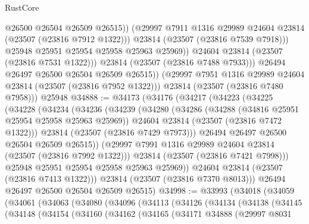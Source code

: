 \begin{lexlean}{RustCore}
\begin{coremodule}
                        @26500
                        @26504
                        @26509
                        @26515))
                    (@29997 @7911 @1316 @29989 @24604 @23814 (@23507 (@23816 @7912 @1322)))
                    @23814
                    (@23507 (@23816 @7539 @7918)))
                  @25948
                  @25951
                  @25954
                  @25958
                  @25963
                  @25969))
              @24604
              @23814
              (@23507 (@23816 @7531 @1322)))
            @23814
            (@23507 (@23816 @7488 @7933)))
          @26494
          @26497
          @26500
          @26504
          @26509
          @26515))
      (@29997 @7951 @1316 @29989 @24604 @23814 (@23507 (@23816 @7952 @1322)))
      @23814
      (@23507 (@23816 @7480 @7958)))
    @25948
@34888 := @34173
    (@34176
      (@34217
        (@34223
          (@34225
            (@34228
              (@34234
                (@34236
                  (@34239
                    (@34280
                      (@34286
                        (@34288 (@34816 @25951 @25954 @25958 @25963 @25969))
                        @24604
                        @23814
                        (@23507 (@23816 @7472 @1322)))
                      @23814
                      (@23507 (@23816 @7429 @7973)))
                    @26494
                    @26497
                    @26500
                    @26504
                    @26509
                    @26515))
                (@29997 @7991 @1316 @29989 @24604 @23814 (@23507 (@23816 @7992 @1322)))
                @23814
                (@23507 (@23816 @7421 @7998)))
              @25948
              @25951
              @25954
              @25958
              @25963
              @25969))
          @24604
          @23814
          (@23507 (@23816 @7413 @1322)))
        @23814
        (@23507 (@23816 @7370 @8013)))
      @26494
      @26497
      @26500
      @26504
      @26509
      @26515)
@34998 := @33993
    (@34018
      (@34059
        (@34061
          (@34063
            (@34080
              (@34096
                (@34113
                  (@34126
                    (@34134
                      (@34138
                        (@34145
                          (@34148
                            (@34154
                              (@34160
                                (@34162
                                  (@34165
                                    (@34171
                                      @34888
                                      (@29997
                                        @8031

\end{coremodule}
\end{lexlean}
